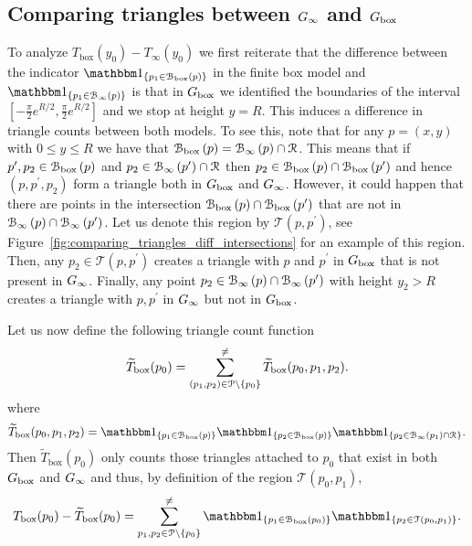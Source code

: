 %

\subsection{Comparing triangles between $G_{\infty}$ and $G_{\mathrm{box}}$}

To analyze $T_{\text{box}}(y_0) - T_\infty(y_0)$ we first reiterate that the difference between the indicator $\ind{p_1 \in \BallPon{p}}$ in the finite box model and $\ind{p_1 \in \BallPo{p}}$ is that in $G_{\mathrm{box}}$ we identified the boundaries of the interval $[-\frac{\pi}{2}e^{R/2}, \frac{\pi}{2} e^{R/2}]$ and we stop at height $y = R$. This induces a difference in triangle counts between both models. 
To see this, note that for any $p = (x,y)$ with $0 \le y \le R$ we have that ${\mathcal B}_{\text{box}}\left(p\right) = {\mathcal B}_{\infty}\left(p\right) \cap {\mathcal R}$. This means that if $p^\prime, p_2 \in {\mathcal B}_{\text{box}}\left(p\right)$ and $p_2 \in {\mathcal B}_{\infty}\left(p^\prime\right) \cap {\mathcal R}$ then $p_2 \in {\mathcal B}_{\text{box}}\left(p\right) \cap {\mathcal B}_{\text{box}}\left(p^\prime\right)$ and hence $(p,p^\prime,p_2)$ form a triangle both in $G_{\mathrm{box}}$ and $G_{\infty}$. However, it could happen that there are points in the intersection ${\mathcal B}_{\text{box}}\left(p\right) \cap {\mathcal B}_{\text{box}}\left(p^\prime\right)$ that are not in ${\mathcal B}_{\infty}\left(p\right) \cap {\mathcal B}_{\infty}\left(p^\prime\right)$. Let us denote this region by $\mathcal{T}(p,p^\prime)$, see Figure~\ref{fig:comparing_triangles_diff_intersections} for an example of this region. Then, any $p_2 \in \mathcal{T}(p,p^\prime)$ creates a triangle with $p$ and $p^\prime$ in $G_{\mathrm{box}}$ that is not present in $G_{\infty}$. Finally, any point $p_2 \in {\mathcal B}_{\infty}\left(p\right) \cap {\mathcal B}_{\infty}\left(p^\prime\right)$ with height $y_2 > R$ creates a triangle with $p, p^\prime$ in $G_{\infty}$ but not in $G_{\mathrm{box}}$.

Let us now define the following triangle count function
\[
	\widetilde{T}_{\text{box}}(p_0) = \sum_{(p_1, p_2) \in {\mathcal P} \setminus \{p_0\}}^{\ne} 
		\widetilde{T}_{\text{box}}(p_0,p_1,p_2).
\]
where
\[
	\widetilde{T}_{\text{box}}(p_0,p_1,p_2) = \ind{p_1 \in \BallPon{p}}\ind{p_2 \in \BallPon{p}}\ind{p_2 \in \BallPo{p_1} \cap \Rcal}.
\]
Then $\widetilde{T}_{\text{box}}(p_0)$ only counts those triangles attached to $p_0$ that exist in both $G_{\mathrm{box}}$ and $G_{\infty}$ and thus, by definition of the region $\mathcal{T}(p_0,p_1)$,
\[
	T_{\text{box}}(p_0) - \widetilde{T}_{\text{box}}(p_0)
	= \sum_{p_1, p_2 \in \Pcal \setminus \{p_0\}}^{\ne} \ind{p_1 \in \BallPon{p_0}} 
			\ind{p_2 \in \mathcal{T}(p_0, p_1)}.
\]

